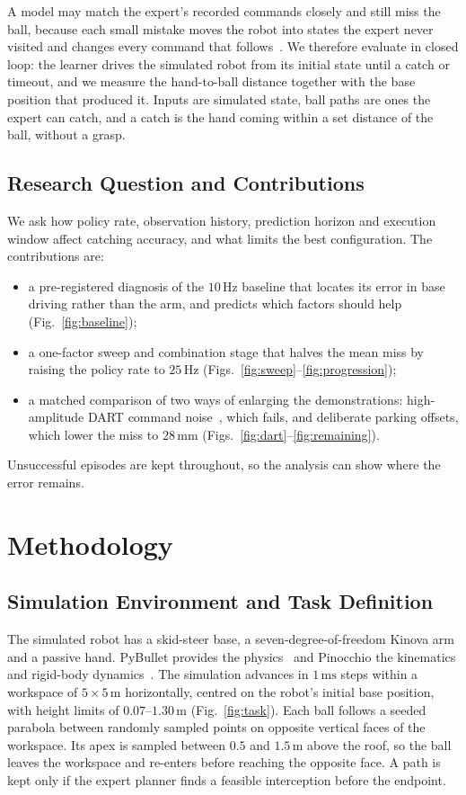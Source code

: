 \documentclass[conference]{IEEEtran}
\begin{document}
A model may match the expert's recorded commands closely and still miss the ball, because each small mistake moves the robot into states the expert never visited and changes every command that follows~\cite{ross2011}. We therefore evaluate in closed loop: the learner drives the simulated robot from its initial state until a catch or timeout, and we measure the hand-to-ball distance together with the base position that produced it. Inputs are simulated state, ball paths are ones the expert can catch, and a catch is the hand coming within a set distance of the ball, without a grasp.

\subsection{Research Question and Contributions}
We ask how policy rate, observation history, prediction horizon and execution window affect catching accuracy, and what limits the best configuration. The contributions are:
\begin{itemize}
\item a pre-registered diagnosis of the $10\,\mathrm{Hz}$ baseline that locates its error in base driving rather than the arm, and predicts which factors should help (Fig.~\ref{fig:baseline});
\item a one-factor sweep and combination stage that halves the mean miss by raising the policy rate to $25\,\mathrm{Hz}$ (Figs.~\ref{fig:sweep}--\ref{fig:progression});
\item a matched comparison of two ways of enlarging the demonstrations: high-amplitude DART command noise~\cite{laskey2017}, which fails, and deliberate parking offsets, which lower the miss to $28\,\mathrm{mm}$ (Figs.~\ref{fig:dart}--\ref{fig:remaining}).
\end{itemize}
Unsuccessful episodes are kept throughout, so the analysis can show where the error remains.

\section{Methodology}
\subsection{Simulation Environment and Task Definition}
The simulated robot has a skid-steer base, a seven-degree-of-freedom Kinova arm and a passive hand. PyBullet provides the physics~\cite{pybullet} and Pinocchio the kinematics and rigid-body dynamics~\cite{pinocchio}. The simulation advances in $1\,\mathrm{ms}$ steps within a workspace of $5\times5\,\mathrm{m}$ horizontally, centred on the robot's initial base position, with height limits of $0.07$--$1.30\,\mathrm{m}$ (Fig.~\ref{fig:task}). Each ball follows a seeded parabola between randomly sampled points on opposite vertical faces of the workspace. Its apex is sampled between $0.5$ and $1.5\,\mathrm{m}$ above the roof, so the ball leaves the workspace and re-enters before reaching the opposite face. A path is kept only if the expert planner finds a feasible interception before the endpoint.
\end{document}

